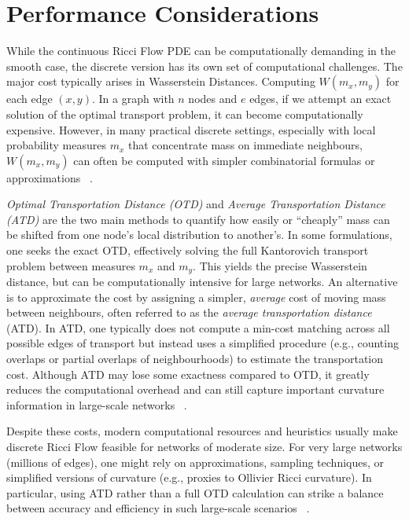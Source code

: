 
\section{Performance Considerations}
\label{sec:ricci_flow_networks_performance}

While the continuous Ricci Flow PDE can be computationally demanding in the smooth case, the discrete version has its own set of computational challenges. The major cost typically arises in Wasserstein Distances. Computing $W(m_x, m_y)$ for each edge $(x,y)$. In a graph with $n$ nodes and $e$ edges, if we attempt an exact solution of the optimal transport problem, it can become computationally expensive. However, in many practical discrete settings, especially with local probability measures $m_x$ that concentrate mass on immediate neighbours, $W(m_x,m_y)$ can often be computed with simpler combinatorial formulas or approximations ~\cite{Ni:communitydetectionnetworksricci}. 

\emph{Optimal Transportation Distance (OTD)} and  \emph{Average Transportation Distance (ATD)} are the two main methods to quantify how easily or “cheaply” mass can be shifted from one node’s local distribution to another’s.
In some formulations, one seeks the exact OTD, effectively solving the full Kantorovich transport problem between measures $m_x$ and $m_y$. This yields the precise Wasserstein distance, but can be computationally intensive for large networks. An alternative is to approximate the cost by assigning a simpler, \emph{average} cost of moving mass between neighbours, often referred to as the \emph{average transportation distance} (ATD). In ATD, one typically does not compute a min-cost matching across all possible edges of transport but instead uses a simplified procedure (e.g., counting overlaps or partial overlaps of neighbourhoods) to estimate the transportation cost. Although ATD may lose some exactness compared to OTD, it greatly reduces the computational overhead and can still capture important curvature information in large-scale networks ~\cite{ni2018networkalignmentdiscreteollivierricci}.

Despite these costs, modern computational resources and heuristics usually make discrete Ricci Flow feasible for networks of moderate size. For very large networks (millions of edges), one might rely on approximations, sampling techniques, or simplified versions of curvature (e.g., proxies to Ollivier Ricci curvature). In particular, using ATD rather than a full OTD calculation can strike a balance between accuracy and efficiency in such large-scale scenarios ~\cite{ni2018networkalignmentdiscreteollivierricci}.



